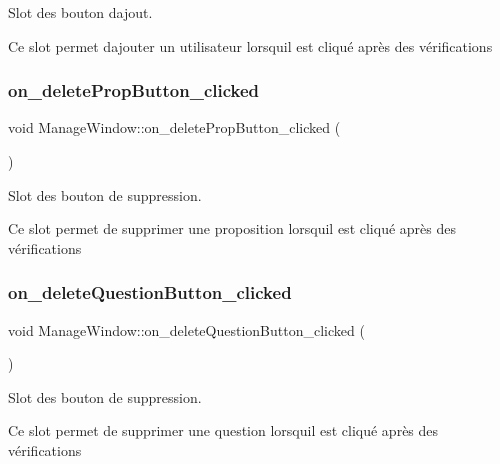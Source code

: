 Slot des bouton d\textquotesingle{}ajout. 

Ce slot permet d\textquotesingle{}ajouter un utilisateur lorsqu\textquotesingle{}il est cliqué après des vérifications \mbox{\label{classManageWindow_ac191196301dfcbb30d995790a7e5e496}} 
\subsubsection{\texorpdfstring{on\+\_\+delete\+Prop\+Button\+\_\+clicked}{on\_deletePropButton\_clicked}}
{\footnotesize\ttfamily void Manage\+Window\+::on\+\_\+delete\+Prop\+Button\+\_\+clicked (\begin{DoxyParamCaption}{ }\end{DoxyParamCaption})\hspace{0.3cm}{\ttfamily [slot]}}



Slot des bouton de suppression. 

Ce slot permet de supprimer une proposition lorsqu\textquotesingle{}il est cliqué après des vérifications \mbox{\label{classManageWindow_a9eba7473d0b4bacf9767629537672778}} 
\subsubsection{\texorpdfstring{on\+\_\+delete\+Question\+Button\+\_\+clicked}{on\_deleteQuestionButton\_clicked}}
{\footnotesize\ttfamily void Manage\+Window\+::on\+\_\+delete\+Question\+Button\+\_\+clicked (\begin{DoxyParamCaption}{ }\end{DoxyParamCaption})\hspace{0.3cm}{\ttfamily [slot]}}



Slot des bouton de suppression. 

Ce slot permet de supprimer une question lorsqu\textquotesingle{}il est cliqué après des vérifications \mbox{\label{classManageWindow_a89f9fbc2426fb7c3afb890ef446c2161}} 
